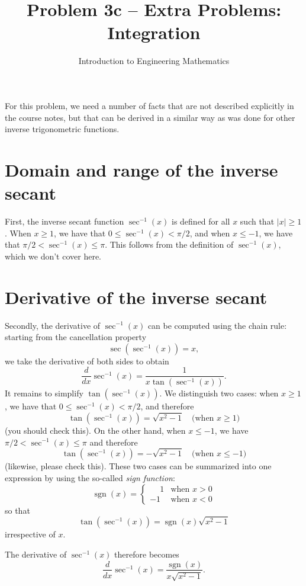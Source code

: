 \documentclass{article}
\title{Problem 3c -- Extra Problems: Integration}
\author{Introduction to Engineering Mathematics}
\DeclareMathOperator{\sgn}{sgn}
\begin{document}
\maketitle

For this problem, we need a number of facts that are not described explicitly in the course notes, but that can be derived in a similar way as was done for other inverse trigonometric functions.

\section{Domain and range of the inverse secant}

First, the inverse secant function $\sec^{-1}(x)$ is defined for all $x$ such that $|x| \ge 1$. When $x \ge 1$, we have that $0 \le \sec^{-1}(x) < \pi / 2$, and when $x \le -1$, we have that $\pi/2 < \sec^{-1}(x) \le \pi$. This follows from the definition of $\sec^{-1}(x)$, which we don't cover here.

\section{Derivative of the inverse secant}

Secondly, the derivative of $\sec^{-1}(x)$ can be computed using the chain rule: starting from the cancellation property
\[
    \sec \left( \sec^{-1}(x) \right) = x,
\]
we take the derivative of both sides to obtain
\[
    \frac{d}{dx} \sec^{-1}(x) = \frac{1}{x \tan\left( \sec^{-1}(x) \right)}.
\]
It remains to simplify $\tan \left( \sec^{-1}(x) \right)$. We distinguish two cases: when $x \ge 1$, we have that $0 \le \sec^{-1}(x) < \pi/2$, and therefore
\[
    \tan \left( \sec^{-1}(x) \right) = \sqrt{x^2 - 1} \quad \text{(when $x \ge 1$)}
\]
(you should check this). On the other hand, when $x \le -1$, we have $\pi/2 < \sec^{-1}(x) \le \pi$ and therefore
\[
    \tan \left( \sec^{-1}(x) \right) = - \sqrt{x^2 - 1} \quad \text{(when $x \le -1$)}
\]
(likewise, please check this). These two cases can be summarized into one expression by using the so-called \emph{sign function}:
\[
    \sgn(x) = \begin{cases}
        \phantom{+}1 & \text{when $x > 0$} \\
        -1 & \text{when $x < 0$}
    \end{cases}
\]
so that
\[
\tan \left( \sec^{-1}(x) \right) = \sgn(x) \sqrt{x^2 - 1}
\]
irrespective of $x$.

The derivative of $\sec^{-1}(x)$ therefore becomes
\[
    \frac{d}{dx} \sec^{-1}(x) = \frac{\sgn(x)}{x \sqrt{x^2 - 1}}.
\]
\end{document}
